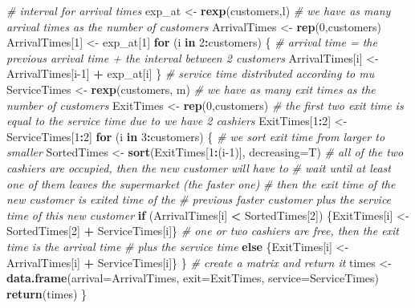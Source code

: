 \documentclass[]{article}
\newenvironment{Shaded}{\begin{snugshade}}{\end{snugshade}}
\newcommand{\CommentTok}[1]{\textcolor[rgb]{0.56,0.35,0.01}{\textit{#1}}}
\newcommand{\ControlFlowTok}[1]{\textcolor[rgb]{0.13,0.29,0.53}{\textbf{#1}}}
\newcommand{\DataTypeTok}[1]{\textcolor[rgb]{0.13,0.29,0.53}{#1}}
\newcommand{\DecValTok}[1]{\textcolor[rgb]{0.00,0.00,0.81}{#1}}
\newcommand{\KeywordTok}[1]{\textcolor[rgb]{0.13,0.29,0.53}{\textbf{#1}}}
\newcommand{\NormalTok}[1]{#1}
\newcommand{\OperatorTok}[1]{\textcolor[rgb]{0.81,0.36,0.00}{\textbf{#1}}}
\newcommand{\StringTok}[1]{\textcolor[rgb]{0.31,0.60,0.02}{#1}}
\begin{document}
\begin{Shaded}
\begin{Highlighting}[]
  \CommentTok{# interval for arrival times}
\NormalTok{  exp_at <-}\StringTok{ }\KeywordTok{rexp}\NormalTok{(customers,l)}
  \CommentTok{# we have as many arrival times as the number of customers}
\NormalTok{  ArrivalTimes <-}\StringTok{ }\KeywordTok{rep}\NormalTok{(}\DecValTok{0}\NormalTok{,customers) }
\NormalTok{  ArrivalTimes[}\DecValTok{1}\NormalTok{] <-}\StringTok{ }\NormalTok{exp_at[}\DecValTok{1}\NormalTok{]}
  \ControlFlowTok{for}\NormalTok{ (i }\ControlFlowTok{in} \DecValTok{2}\OperatorTok{:}\NormalTok{customers) \{}
    \CommentTok{# arrival time = the previous arrival time + the interval between 2 customers}
\NormalTok{    ArrivalTimes[i] <-}\StringTok{ }\NormalTok{ArrivalTimes[i}\DecValTok{-1}\NormalTok{] }\OperatorTok{+}\StringTok{ }\NormalTok{exp_at[i]}
\NormalTok{  \} }
  \CommentTok{# service time distributed according to mu}
\NormalTok{  ServiceTimes <-}\StringTok{ }\KeywordTok{rexp}\NormalTok{(customers, m)}
  \CommentTok{# we have as many exit times as the number of customers}
\NormalTok{  ExitTimes <-}\StringTok{ }\KeywordTok{rep}\NormalTok{(}\DecValTok{0}\NormalTok{,customers)}
  \CommentTok{# the first two exit time is equal to the service time due to we have 2 cashiers}
\NormalTok{  ExitTimes[}\DecValTok{1}\OperatorTok{:}\DecValTok{2}\NormalTok{] <-}\StringTok{ }\NormalTok{ServiceTimes[}\DecValTok{1}\OperatorTok{:}\DecValTok{2}\NormalTok{]}
  \ControlFlowTok{for}\NormalTok{ (i }\ControlFlowTok{in} \DecValTok{3}\OperatorTok{:}\NormalTok{customers) \{}
    \CommentTok{# we sort exit time from larger to smaller}
\NormalTok{    SortedTimes <-}\StringTok{ }\KeywordTok{sort}\NormalTok{(ExitTimes[}\DecValTok{1}\OperatorTok{:}\NormalTok{(i}\DecValTok{-1}\NormalTok{)], }\DataTypeTok{decreasing=}\NormalTok{T)}
    \CommentTok{# all of the two cashiers are occupied, then the new customer will have to }
    \CommentTok{# wait until at least one of them leaves the supermarket (the faster one)}
    \CommentTok{# then the exit time of the new customer is exited time of the }
    \CommentTok{# previous faster customer plus the service time of this new customer}
    \ControlFlowTok{if}\NormalTok{ (ArrivalTimes[i] }\OperatorTok{<}\StringTok{ }\NormalTok{SortedTimes[}\DecValTok{2}\NormalTok{]) \{ExitTimes[i] <-}\StringTok{ }\NormalTok{SortedTimes[}\DecValTok{2}\NormalTok{] }\OperatorTok{+}\StringTok{ }\NormalTok{ServiceTimes[i]\}}
    \CommentTok{# one or two cashiers are free, then the exit time is the arrival time}
    \CommentTok{# plus the service time}
    \ControlFlowTok{else}\NormalTok{ \{ExitTimes[i] <-}\StringTok{ }\NormalTok{ArrivalTimes[i] }\OperatorTok{+}\StringTok{ }\NormalTok{ServiceTimes[i]\}}
\NormalTok{  \}}
  \CommentTok{# create a matrix and return it}
\NormalTok{  times <-}\StringTok{ }\KeywordTok{data.frame}\NormalTok{(}\DataTypeTok{arrival=}\NormalTok{ArrivalTimes,}
                      \DataTypeTok{exit=}\NormalTok{ExitTimes,}
                      \DataTypeTok{service=}\NormalTok{ServiceTimes)}
  \KeywordTok{return}\NormalTok{(times)}
\NormalTok{\}}
\end{Highlighting}
\end{Shaded}
\end{document}
